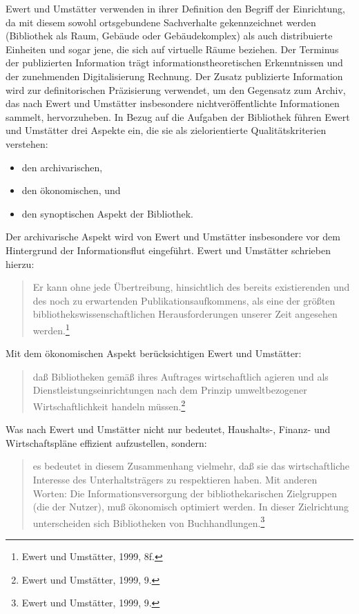 \documentclass[a4paper,
fontsize=11pt,
oneside,
numbers=noperiodatend,
parskip=half-,
bibliography=totoc,
final
]{scrartcl}
\begin{document}
Ewert und Umstätter verwenden in ihrer Definition den Begriff der
Einrichtung, da mit diesem sowohl ortsgebundene Sachverhalte
gekennzeichnet werden (Bibliothek als Raum, Gebäude oder Gebäudekomplex)
als auch distribuierte Einheiten und sogar jene, die sich auf virtuelle
Räume beziehen. Der Terminus der publizierten Information trägt
informationstheoretischen Erkenntnissen und der zunehmenden
Digitalisierung Rechnung. Der Zusatz publizierte Information wird zur
definitorischen Präzisierung verwendet, um den Gegensatz zum Archiv, das
nach Ewert und Umstätter insbesondere nichtveröffentlichte Informationen
sammelt, hervorzuheben. In Bezug auf die Aufgaben der Bibliothek führen
Ewert und Umstätter drei Aspekte ein, die sie als zielorientierte
Qualitätskriterien verstehen:

\begin{itemize}
\tightlist
\item
  den archivarischen,
\item
  den ökonomischen, und
\item
  den synoptischen Aspekt der Bibliothek.
\end{itemize}

Der archivarische Aspekt wird von Ewert und Umstätter insbesondere vor
dem Hintergrund der Informationsflut eingeführt. Ewert und Umstätter
schrieben hierzu:

\begin{quote}
Er kann ohne jede Übertreibung, hinsichtlich des bereits existierenden
und des noch zu erwartenden Publikationsaufkommens, als eine der größten
bibliothekswissenschaftlichen Herausforderungen unserer Zeit angesehen
werden.\footnote{Ewert und Umstätter, 1999, 8f.}
\end{quote}

Mit dem ökonomischen Aspekt berücksichtigen Ewert und Umstätter:

\begin{quote}
daß Bibliotheken gemäß ihres Auftrages wirtschaftlich agieren und als
Dienstleistungseinrichtungen nach dem Prinzip umweltbezogener
Wirtschaftlichkeit handeln müssen.\footnote{Ewert und Umstätter, 1999,
  9.}
\end{quote}

Was nach Ewert und Umstätter nicht nur bedeutet, Haushalts-, Finanz- und
Wirtschaftspläne effizient aufzustellen, sondern:

\begin{quote}
es bedeutet in diesem Zusammenhang vielmehr, daß sie das wirtschaftliche
Interesse des Unterhaltsträgers zu respektieren haben. Mit anderen
Worten: Die Informationsversorgung der bibliothekarischen Zielgruppen
(die der Nutzer), muß ökonomisch optimiert werden. In dieser
Zielrichtung unterscheiden sich Bibliotheken von
Buchhandlungen.\footnote{Ewert und Umstätter, 1999, 9.}
\end{quote}
\end{document}
